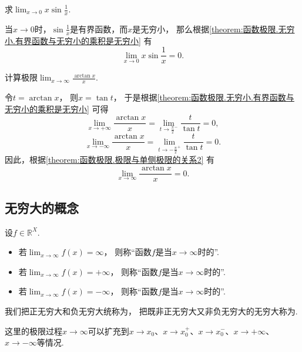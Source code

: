 \begin{example}
求\(\lim_{x\to0} x \sin\frac1x\).
\begin{solution}
当\(x\to0\)时，\(\sin\frac1x\)是有界函数，而\(x\)是无穷小，
那么根据\cref{theorem:函数极限.无穷小.有界函数与无穷小的乘积是无穷小}
有\begin{equation}
	\lim_{x\to0} x \sin\frac1x = 0.
\end{equation}
\end{solution}
\end{example}

\begin{example}
计算极限\(\lim_{x\to\infty} \frac{\arctan x}{x}\).
\begin{solution}
令\(t = \arctan x\)，
则\(x = \tan t\)，
于是根据\cref{theorem:函数极限.无穷小.有界函数与无穷小的乘积是无穷小} 可得\[
	\lim_{x\to+\infty} \frac{\arctan x}{x}
	= \lim_{t\to\frac\pi2^-} \frac{t}{\tan t}
	= 0,
\]\[
	\lim_{x\to-\infty} \frac{\arctan x}{x}
	= \lim_{t\to-\frac\pi2^+} \frac{t}{\tan t}
	= 0.
\]
因此，根据\cref{theorem:函数极限.极限与单侧极限的关系2} 有\begin{equation}
	\lim_{x\to\infty} \frac{\arctan x}{x} = 0.
\end{equation}
\end{solution}
\end{example}

\subsection{无穷大的概念}
\begin{definition}
设\(f\in\mathbb{R}^X\).
\begin{itemize}
	\item 若\(\lim_{x\to\infty} f(x) = \infty\)，
	则称“函数\(f\)是当\(x\to\infty\)时的”.

	\item 若\(\lim_{x\to\infty} f(x) = +\infty\)，
	则称“函数\(f\)是当\(x\to\infty\)时的”.

	\item 若\(\lim_{x\to\infty} f(x) = -\infty\)，
	则称“函数\(f\)是当\(x\to\infty\)时的”.
\end{itemize}
我们把正无穷大和负无穷大统称为，
把既非正无穷大又非负无穷大的无穷大称为.
\end{definition}
这里的极限过程\(x \to \infty\)可以扩充到\(x \to x_0\)、\(x \to x_0^+\)、\(x \to x_0^-\)、\(x \to +\infty\)、\(x \to -\infty\)等情况.

